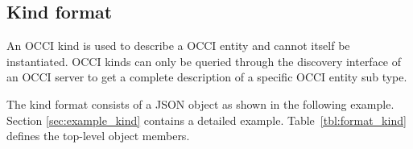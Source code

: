 \documentclass[10pt,a4paper]{article}
\begin{document}
%
%

\subsection{Kind format}
\label{sec:format_kind}

An OCCI kind is used to describe a OCCI entity and cannot itself be 
instantiated. OCCI kinds can only be queried through the discovery interface 
of an OCCI server to get a complete description of a specific OCCI entity sub type.

The kind format consists of a JSON object as shown in the
following example. Section \ref{sec:example_kind} contains a detailed example.
Table~\ref{tbl:format_kind} defines the top-level object members.
\end{document}
